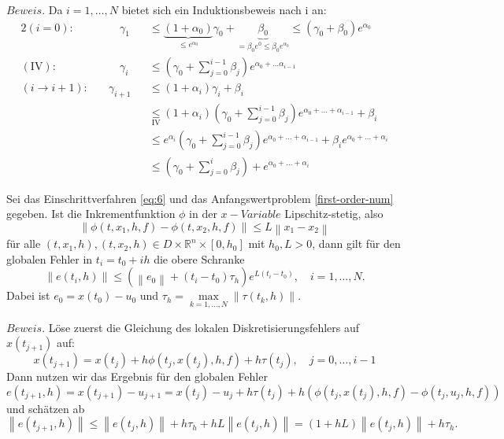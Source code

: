 $Beweis.$ Da $i=1,\dots,N$ bietet sich ein Induktionsbeweis nach i an:
\begin{alignat*}{2}
(i=0):& \qquad \gamma_1 &&\leq
\underbrace{(1 + \alpha_0)}_{\leq e^{\alpha_0}}\gamma_0 +
\underbrace{\beta_0}_{=\beta_0 e^{0} \leq \beta_0 e^{\alpha_0}} \leq (\gamma_0 + \beta_0)e^{\alpha_0}\\
(\text{IV}):& \qquad
\gamma_{i} &&\leq \left( \gamma_0 + \sum_{j=0}^{i-1}\beta_j \right) e^{\alpha_0 + \dots \alpha_{i-1}} \\
(i \rightarrow i+1):& \quad
\gamma_{i+1} &&\leq (1 + \alpha_{i})\gamma_{i} + \beta_i\\
& &&\underset{\text{IV}}{\leq} (1 + \alpha_i)
\left( \gamma_0 + \sum_{j=0}^{i-1}\beta_j \right) e^{\alpha_0 + \dots + \alpha_{i-1}}+\beta_{i}\\
&  &&\leq e^{\alpha_i} \left( \gamma_0 + \sum_{j=0}^{i-1}\beta_j \right) e^{\alpha_0 + \dots + \alpha_{i-1}}
+ \beta_i e^{\alpha_0 + \dots + \alpha_{i}}\\
&  &&\leq \left( \gamma_0 +  \sum_{j=0}^{i}\beta_j \right) + e^{\alpha_0 + \dots + \alpha_{i}}
\end{alignat*}
\begin{satz}
    Sei das Einschrittverfahren \eqref{eq:6} und das Anfangswertproblem \eqref{first-order-num} gegeben. Ist  die
    Inkrementfunktion $\phi$ in der $x-Variable$ Lipschitz-stetig, also
    \[
        \left\lVert \phi(t, x_1, h, f) - \phi(t, x_2, h, f) \right\rVert \leq L \left\lVert x_1 - x_2 \right\rVert
    \]
    für alle $(t, x_1, h),(t, x_2, h) \in D \times \mathbb{R}^n \times [0, h_0]$ mit $h_0, L>0$, dann gilt für den
    globalen Fehler in $t_i = t_0 + ih$ die obere Schranke
    \[
        \left\lVert e(t_i,h) \right\rVert \leq \left( \left\lVert e_0 \right\rVert + (t_i-t_0)\tau_h \right)
        e^{L(t_i-t_0)}, \quad i = 1, \dots, N.
    \]
    Dabei ist $e_0 = x(t_0)-u_0$ und $\tau_h= \max\limits_{k=1,\dots,N} \left\lVert \tau(t_k,h) \right\rVert $.
\end{satz}
$Beweis.$ Löse zuerst die Gleichung des lokalen Diskretisierungsfehlers auf $x(t_{j+1})$ auf:
\[
    x(t_{j+1}) = x(t_j) + h \phi(t_j, x(t_j),h,f) + h \tau(t_j), \quad j = 0, \dots , i-1
\]
Dann nutzen wir das Ergebnis für den globalen Fehler
\[
    e(t_{j+1},h) = x(t_{j+1}) - u_{j+1} = x(t_j) - u_j + h \tau(t_j)
    + h \left( \phi(t_j, x(t_j),h,f) - \phi(t_j, u_j, h, f) \right)
\]
und schätzen ab
\[
    \left\lVert e(t_{j+1},h) \right\rVert \leq \left\lVert e(t_j, h) \right\rVert + h\tau_h
    + hL\left\lVert e(t_j,h) \right\rVert = (1 + hL) \left\lVert e(t_j,h) \right\rVert + h\tau_h.
\]
